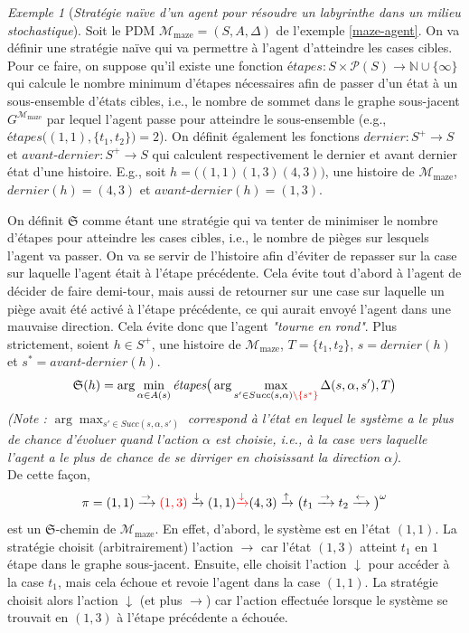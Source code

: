 \documentclass[12pt,a4paper]{report}
\theoremstyle{definition}%
\theoremstyle{remark}
\newtheorem{example}{Exemple}[chapter]
\begin{document}
\begin{example}[\textit{Stratégie naïve d'un agent pour résoudre un labyrinthe dans un milieu stochastique}] \label{example-strat-history}
	Soit le PDM $\mathcal{M}_{\text{maze}} = (S, A, \Delta)$ de l'exemple
	\ref{maze-agent}.	On va définir une stratégie naïve qui va permettre à l'agent d'atteindre les cases cibles.
	Pour ce faire, on suppose qu'il existe une fonction $\textit{étapes} : S \times \mathcal{P}(S) \rightarrow \mathbb{N} \cup \{ \infty \}$ qui calcule le
	nombre minimum d'étapes nécessaires afin de passer d'un état à un sous-ensemble d'états cibles, i.e., le nombre de sommet dans le graphe sous-jacent $G^{\mathcal{M}_{\text{maze}}}$ par lequel l'agent passe pour atteindre le sous-ensemble (e.g., $\textit{étapes}\big((1,1), \{t_1, t_2\}\big) = 2$).
	On définit également les fonctions $dernier : S^+ \rightarrow S$ et $avant\text{-}dernier: S^+ \rightarrow S$
	qui calculent respectivement le dernier et avant dernier état d'une
	histoire. E.g., soit $h = \big((1, 1) (1, 3) (4, 3)\big)$, une histoire de
  $\mathcal{M}_{\text{maze}}$, $dernier(h) = (4, 3)$ et $avant\text{-}dernier(h) = (1,3)$. \par
	On définit $\mathfrak{S}$ comme étant une stratégie qui va tenter de
	minimiser le nombre d'étapes pour atteindre
	les cases cibles, i.e., le nombre de pièges sur lesquels l'agent va passer. On va se servir de l'histoire afin d'éviter de repasser
	sur la case sur laquelle l'agent était à l'étape précédente. Cela évite
	tout d'abord à l'agent de décider de faire demi-tour, mais aussi de retourner sur une case sur laquelle un piège avait été activé à l'étape précédente, ce qui aurait envoyé
	l'agent dans une mauvaise direction.
	Cela évite donc que l'agent \textit{"tourne en rond"}. Plus
	strictement, soient $h \in S^+$, une histoire de $\mathcal{M}_{\text{maze}}$,
	$T = \{t_1, t_2\}$, $s = dernier(h)$ et $s^* = avant\text{-}dernier(h)$.
	\[
		\mathfrak{S}(h) = \arg \min_{\alpha \in A(s)}
		\textit{étapes}\big(\arg \max_{s' \in Succ(s, \alpha) {\color{red}\setminus \{ s^* \}}} \Delta(s, \alpha, s'), T \big)
	\]
	\textit{(Note : $\arg \max_{s' \in Succ(s, \alpha, s')}$ correspond à l'état en lequel le système a le plus de chance d'évoluer quand l'action $\alpha$ est choisie, i.e., à la case vers laquelle l'agent a le plus de chance de se
	dirriger en choisissant la direction $\alpha$)}. \\
	De cette façon, \[\pi = (1, 1) \xrightarrow{\rightarrow} {\color{red}(1, 3)}
	\xrightarrow{\downarrow} (1, 1) {\color{red} \xrightarrow{\downarrow}} (4,
	3)\xrightarrow{\uparrow} \big(t_1 \xrightarrow{\rightarrow} t_2
	\xrightarrow{\leftarrow} \big)^\omega \] est un $\mathfrak{S}$-chemin de
	$\mathcal{M}_{\text{maze}}$. En effet, d'abord, le système est en l'état
	$(1,1)$. La stratégie choisit (arbitrairement) l'action $\rightarrow$ car
	l'état $(1, 3)$ atteint $t_1$ en $1$ étape dans le graphe sous-jacent.
	Ensuite, elle choisit l'action $\downarrow$ pour accéder à la case $t_1$,
	mais cela échoue et revoie l'agent dans la case $(1,1)$. La stratégie choisit
	alors l'action $\downarrow$ (et plus $\rightarrow$) car l'action effectuée
	lorsque le système se trouvait en $(1, 3)$ à l'étape précédente a échouée.
	\par


\end{example}
\end{document}
